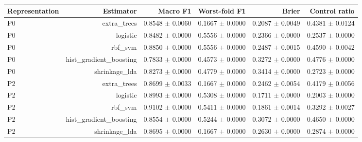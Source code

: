\begin{tabular}{lrrrrr}
\hline
Representation & Estimator & Macro F1 & Worst-fold F1 & Brier & Control ratio \\
\hline
P0 & extra\_trees & 0.8548 $\pm$ 0.0060 & 0.1667 $\pm$ 0.0000 & 0.2087 $\pm$ 0.0049 & 0.4381 $\pm$ 0.0124 \\
P0 & logistic & 0.8482 $\pm$ 0.0000 & 0.5556 $\pm$ 0.0000 & 0.2366 $\pm$ 0.0000 & 0.2537 $\pm$ 0.0000 \\
P0 & rbf\_svm & 0.8850 $\pm$ 0.0000 & 0.5556 $\pm$ 0.0000 & 0.2487 $\pm$ 0.0015 & 0.4590 $\pm$ 0.0042 \\
P0 & hist\_gradient\_boosting & 0.7833 $\pm$ 0.0000 & 0.4573 $\pm$ 0.0000 & 0.3272 $\pm$ 0.0000 & 0.4776 $\pm$ 0.0000 \\
P0 & shrinkage\_lda & 0.8273 $\pm$ 0.0000 & 0.4779 $\pm$ 0.0000 & 0.3414 $\pm$ 0.0000 & 0.2723 $\pm$ 0.0000 \\
P2 & extra\_trees & 0.8699 $\pm$ 0.0033 & 0.1667 $\pm$ 0.0000 & 0.2462 $\pm$ 0.0054 & 0.4179 $\pm$ 0.0056 \\
P2 & logistic & 0.8993 $\pm$ 0.0000 & 0.5308 $\pm$ 0.0000 & 0.1711 $\pm$ 0.0000 & 0.2003 $\pm$ 0.0000 \\
P2 & rbf\_svm & 0.9102 $\pm$ 0.0000 & 0.5411 $\pm$ 0.0000 & 0.1861 $\pm$ 0.0014 & 0.3292 $\pm$ 0.0027 \\
P2 & hist\_gradient\_boosting & 0.8554 $\pm$ 0.0000 & 0.5244 $\pm$ 0.0000 & 0.3072 $\pm$ 0.0000 & 0.4650 $\pm$ 0.0000 \\
P2 & shrinkage\_lda & 0.8695 $\pm$ 0.0000 & 0.1667 $\pm$ 0.0000 & 0.2630 $\pm$ 0.0000 & 0.2874 $\pm$ 0.0000 \\
\hline
\end{tabular}
